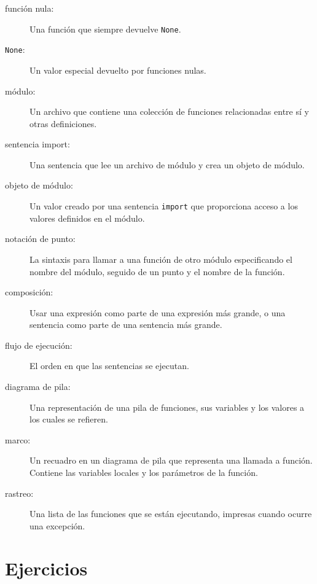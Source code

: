 \documentclass[10pt]{book}
\begin{document}
\begin{description}
\item[función nula:] Una función que siempre devuelve {\tt None}.

\item[{\tt None}:]  Un valor especial devuelto por funciones nulas.

\item[módulo:] Un archivo que contiene una
colección de funciones relacionadas entre sí y otras definiciones.

\item[sentencia import:] Una sentencia que lee un archivo de módulo y crea
un objeto de módulo.

\item[objeto de módulo:] Un valor creado por una sentencia {\tt import}
que proporciona acceso a los valores definidos en el módulo.

\item[notación de punto:]  La sintaxis para llamar a una función de otro
módulo especificando el nombre del módulo, seguido de un punto y
el nombre de la función.

\item[composición:] Usar una expresión como parte de una expresión más grande,
o una sentencia como parte de una sentencia más grande.

\item[flujo de ejecución:]  El orden en que las sentencias se ejecutan.

\item[diagrama de pila:]  Una representación de una pila de funciones,
sus variables y los valores a los cuales se refieren.

\item[marco:]  Un recuadro en un diagrama de pila que representa una llamada a función.
Contiene las variables locales y los parámetros de la función.

\item[rastreo:]  Una lista de las funciones que se están ejecutando,
impresas cuando ocurre una excepción.


\end{description}


\section{Ejercicios}
\end{document}
